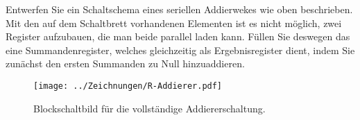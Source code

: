 \begin{problem}
	Entwerfen Sie ein Schaltschema eines seriellen Addierwekes wie oben
	beschrieben. Mit den auf dem Schaltbrett vorhandenen Elementen ist es nicht
	möglich, zwei Register aufzubauen, die man beide parallel laden kann.
	Füllen Sie deswegen das eine Summandenregister, welches gleichzeitig als
	Ergebnisregister dient, indem Sie zunächst den ersten Summanden zu Null
	hinzuaddieren.
\end{problem}

\begin{figure}[htbp]
	\centering
	\texttt{[image: ../Zeichnungen/R-Addierer.pdf]}
	\caption{%
		Blockschaltbild für die vollständige Addiererschaltung.
	}
	\label{fig:R-Addierer}
\end{figure}


\FloatBarrier
\IfFileExists{\bibliographyfile}{
	
}{}



